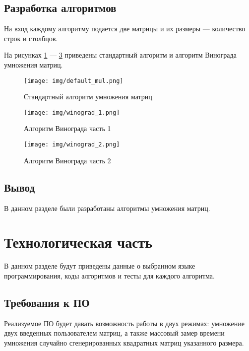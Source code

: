 \documentclass{bmstu}
\begin{document}
\section{Разработка алгоритмов}

На вход каждому алгоритму подается две матрицы и их размеры --- количество строк и столбцов.

На рисунках \ref{fig:default_mul} --- \ref{fig:winograd_2} приведены стандартный алгоритм и алгоритм Винограда умножения матриц.

\clearpage

\begin{figure}[h]
	\centering
        \vspace{0pt}
	\texttt{[image: img/default\_mul.png]}
	\caption{Стандартный алгоритм умножения матриц}
 \vspace*{3in}
	\label{fig:default_mul}
\end{figure}

\clearpage

\begin{figure}[h]
	\centering
        \vspace{0pt}
	\texttt{[image: img/winograd\_1.png]}
	\caption{Алгоритм Винограда часть 1}
        \vspace*{3in}
	\label{fig:winograd_1}
\end{figure}
\clearpage

\begin{figure}[h]
	\centering
        \vspace{0pt}
	\texttt{[image: img/winograd\_2.png]}
	\caption{Алгоритм Винограда часть 2}
        \vspace*{3in}
	\label{fig:winograd_2}
\end{figure}
\clearpage

\section*{Вывод}
В данном разделе были разработаны алгоритмы умножения матриц.

\clearpage

\chapter{Технологическая часть}

В данном разделе будут приведены данные о выбранном языке программирования, коды алгоритмов и тесты для каждого алгоритма.

\section{Требования к ПО}
Реализуемое ПО будет давать возможность работы в двух режимах: умножение двух введенных пользователем матриц, а также массовый замер времени умножения случайно сгенерированных квадратных матриц указанного размера.
\end{document}
